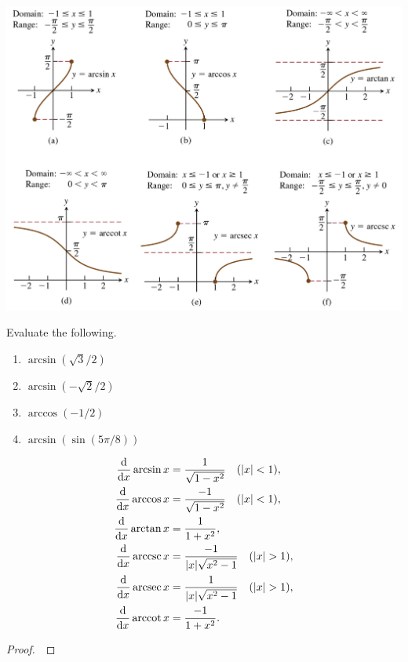 \includegraphics[width=6.5in]{img/inverse_trig_graphs}

\newpage

\begin{example}
Evaluate the following.
\begin{enumerate}
\item $\arcsin(\sqrt 3/2)$
\vfill
\item $\arcsin(-\sqrt 2/2)$
\vfill
\item $\arccos(-1/2)$
\vfill
\item $\arcsin(\sin(5\pi/8))$
\vfill
\end{enumerate}
\end{example}

\newpage

\begin{theorem}
\begin{align}
\frac{\dee}{\dee x}\arcsin x &= \frac{1}{\sqrt{1-x^2}}\quad (|x|<1),\\
\frac{\dee}{\dee x}\arccos x &= \frac{-1}{\sqrt{1-x^2}}\quad (|x|<1),\\
\frac{\dee}{\dee x}\arctan x &= \frac{1}{1+x^2},\\
\frac{\dee}{\dee x}\arccsc x &= \frac{-1}{|x|\sqrt{x^2-1}}\quad (|x|>1),\\
\frac{\dee}{\dee x}\arcsec x &= \frac{1}{|x|\sqrt{x^2-1}}\quad (|x|>1),\\
\frac{\dee}{\dee x}\arccot x &= \frac{-1}{1+x^2}.
\end{align}
\end{theorem}

\begin{proof}\,

\vspace{3.5in}
\end{proof}

